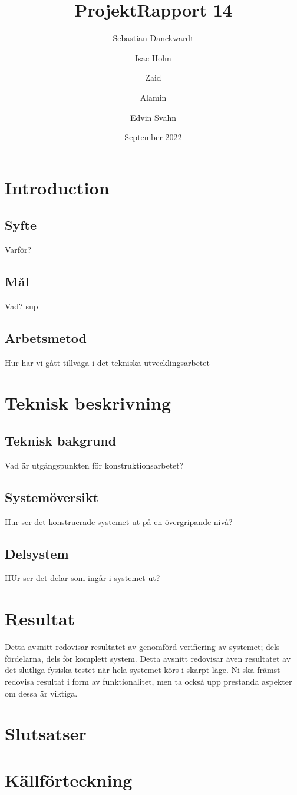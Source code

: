 \documentclass{article}
\title{ProjektRapport 14}
\author{Sebastian Danckwardt \and Isac Holm \and Zaid \and Alamin \and Edvin Svahn}
\date{September 2022}
\begin{document}
\maketitle

\section{Introduction}
\subsection{Syfte}
Varför?
\subsection{Mål}
Vad? sup
\subsection{Arbetsmetod}
Hur har vi gått tillväga i det tekniska utvecklingsarbetet
\section{Teknisk beskrivning}
\subsection{Teknisk bakgrund}
Vad är utgångspunkten för konstruktionsarbetet?
\subsection{Systemöversikt}
Hur ser det konstruerade systemet ut på en övergripande nivå?
\subsection{Delsystem}
HUr ser det delar som ingår i systemet ut?
\section{Resultat}
Detta avsnitt redovisar resultatet av genomförd verifiering av systemet; dels fördelarna, dels för 
komplett system. Detta avsnitt redovisar även resultatet av det slutliga fysiska testet när hela systemet 
körs i skarpt läge. Ni ska främst redovisa resultat i form av funktionalitet, men ta också upp prestanda 
aspekter om dessa är viktiga.  
\section{Slutsatser}
\section{Källförteckning}
\end{document}
